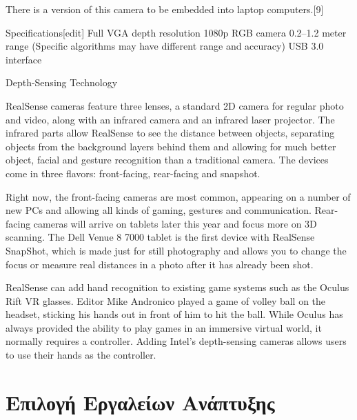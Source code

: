There is a version of this camera to be embedded into laptop computers.[9]

Specifications[edit]
Full VGA depth resolution
1080p RGB camera
0.2–1.2 meter range (Specific algorithms may have different range and accuracy)
USB 3.0 interface


Depth-Sensing Technology

RealSense cameras feature three lenses, a standard 2D camera for regular photo and video, along with an infrared camera and an infrared laser projector. The infrared parts allow RealSense to see the distance between objects, separating objects from the background layers behind them and allowing for much better object, facial and gesture recognition than a traditional camera. The devices come in three flavors: front-facing, rear-facing and snapshot. 

Right now, the front-facing cameras are most common, appearing on a number of new PCs and allowing all kinds of gaming, gestures and communication. Rear-facing cameras will arrive on tablets later this year and focus more on 3D scanning. The Dell Venue 8 7000 tablet is the first device with RealSense SnapShot, which is made just for still photography and allows you to change the focus or measure real distances in a photo after it has already been shot.

RealSense can add hand recognition to existing game systems such as the Oculus Rift VR glasses. Editor Mike Andronico played a game of volley ball on the headset, sticking his hands out in front of him to hit the ball. While Oculus has always provided the ability to play games in an immersive virtual world, it normally requires a controller. Adding Intel's depth-sensing cameras allows users to use their hands as the controller.


\section{Επιλογή Εργαλείων Ανάπτυξης}

